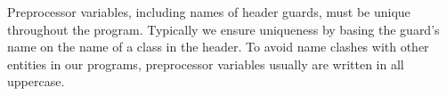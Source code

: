 Preprocessor variables, including names of header guards, must be unique throughout the program. Typically we ensure uniqueness by basing the guard’s name on the name of a class in the header. To avoid name clashes with other entities in our programs, preprocessor variables usually are written in all uppercase.